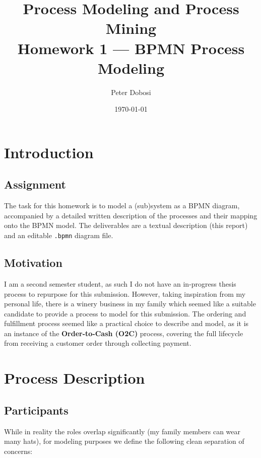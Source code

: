 \documentclass[11pt,a4paper]{article}
\title{Process Modeling and Process Mining\\Homework 1 — BPMN Process Modeling}
\author{Peter Dobosi}
\date{\today}
\begin{document}
\maketitle

\section{Introduction}

\subsection{Assignment}

The task for this homework is to model a (sub)system as a BPMN diagram, accompanied by a detailed written description of the processes and their mapping onto the BPMN model.
The deliverables are a textual description (this report) and an editable \texttt{.bpmn} diagram file.

\subsection{Motivation}

I am a second semester student, as such I do not have an in-progress thesis process to repurpose for this submission.
However, taking inspiration from my personal life, there is a winery business in my family which seemed like a suitable candidate to provide a process to model for this submission.
The ordering and fulfillment process seemed like a practical choice to describe and model, as it is an instance of the \textbf{Order-to-Cash (O2C)} process, covering the full lifecycle from receiving a customer order through collecting payment.

\section{Process Description}

\subsection{Participants}

While in reality the roles overlap significantly (my family members can wear many hats), for modeling purposes we define the following clean separation of concerns:
\end{document}

